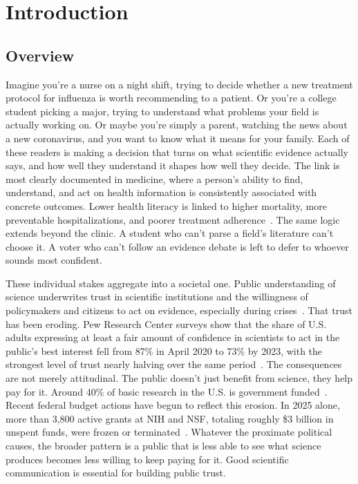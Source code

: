 \chapter{Introduction} \label{chap:introduction}

\section{Overview}

Imagine you're a nurse on a night shift, trying to decide whether a new treatment protocol for influenza is worth recommending to a patient. Or you're a college student picking a major, trying to understand what problems your field is actually working on. Or maybe you're simply a parent, watching the news about a new coronavirus, and you want to know what it means for your family. Each of these readers is making a decision that turns on what scientific evidence actually says, and how well they understand it shapes how well they decide. The link is most clearly documented in medicine, where a person's ability to find, understand, and act on health information is consistently associated with concrete outcomes. Lower health literacy is linked to higher mortality, more preventable hospitalizations, and poorer treatment adherence~\cite{berkman2011lowhealthliteracy, paasche-orlow2007causal}. The same logic extends beyond the clinic. A student who can't parse a field's literature can't choose it. A voter who can't follow an evidence debate is left to defer to whoever sounds most confident.
 
These individual stakes aggregate into a societal one. Public understanding of science underwrites trust in scientific institutions and the willingness of policymakers and citizens to act on evidence, especially during crises~\cite{cologna2025trust, intemann2023scicomm}. That trust has been eroding. Pew Research Center surveys show that the share of U.S. adults expressing at least a fair amount of confidence in scientists to act in the public's best interest fell from 87\% in April 2020 to 73\% by 2023, with the strongest level of trust nearly halving over the same period~\cite{pew2023trust, pew2024trust}. The consequences are not merely attitudinal. The public doesn't just benefit from science, they help pay for it. Around 40\% of basic research in the U.S. is government funded~\cite{Pece_Anderson_2024}. Recent federal budget actions have begun to reflect this erosion. In 2025 alone, more than 3,800 active grants at NIH and NSF, totaling roughly \$3 billion in unspent funds, were frozen or terminated~\cite{sciencenews2025cuts, aaas2026rdbudget, Agarwal_2025}. Whatever the proximate political causes, the broader pattern is a public that is less able to see what science produces becomes less willing to keep paying for it. Good scientific communication is essential for building public trust.
 
